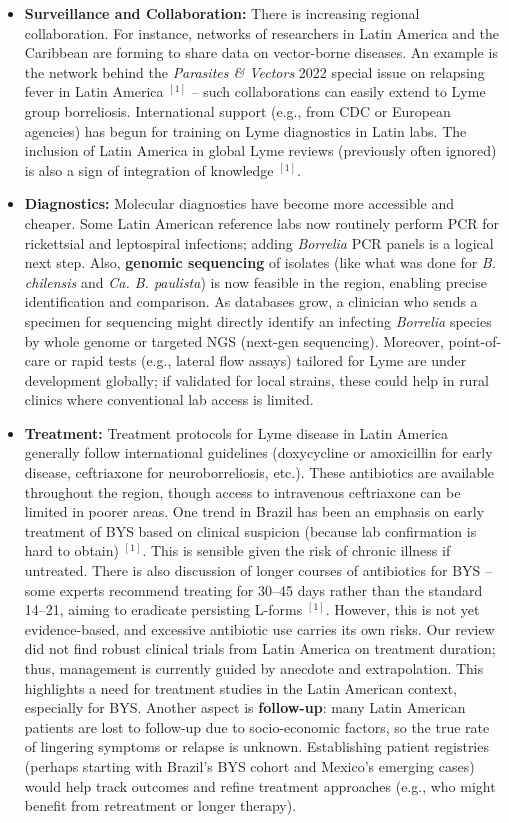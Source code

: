 \documentclass[11pt,letterpaper]{article}
\newcommand{\mycite}[1]{$^{[#1]}$}
\begin{document}
\begin{itemize}
    \item \textbf{Surveillance and Collaboration:} There is increasing regional collaboration. For instance, networks of researchers in Latin America and the Caribbean are forming to share data on vector-borne diseases. An example is the network behind the \textit{Parasites \& Vectors} 2022 special issue on relapsing fever in Latin America \mycite{1} – such collaborations can easily extend to Lyme group borreliosis. International support (e.g., from CDC or European agencies) has begun for training on Lyme diagnostics in Latin labs. The inclusion of Latin America in global Lyme reviews (previously often ignored) is also a sign of integration of knowledge \mycite{1}.

    \item \textbf{Diagnostics:} Molecular diagnostics have become more accessible and cheaper. Some Latin American reference labs now routinely perform PCR for rickettsial and leptospiral infections; adding \textit{Borrelia} PCR panels is a logical next step. Also, \textbf{genomic sequencing} of isolates (like what was done for \textit{B. chilensis} and \textit{Ca. B. paulista}) is now feasible in the region, enabling precise identification and comparison. As databases grow, a clinician who sends a specimen for sequencing might directly identify an infecting \textit{Borrelia} species by whole genome or targeted NGS (next-gen sequencing). Moreover, point-of-care or rapid tests (e.g., lateral flow assays) tailored for Lyme are under development globally; if validated for local strains, these could help in rural clinics where conventional lab access is limited.

    \item \textbf{Treatment:} Treatment protocols for Lyme disease in Latin America generally follow international guidelines (doxycycline or amoxicillin for early disease, ceftriaxone for neuroborreliosis, etc.). These antibiotics are available throughout the region, though access to intravenous ceftriaxone can be limited in poorer areas. One trend in Brazil has been an emphasis on early treatment of BYS based on clinical suspicion (because lab confirmation is hard to obtain) \mycite{1}. This is sensible given the risk of chronic illness if untreated. There is also discussion of longer courses of antibiotics for BYS – some experts recommend treating for 30–45 days rather than the standard 14–21, aiming to eradicate persisting L-forms \mycite{1}. However, this is not yet evidence-based, and excessive antibiotic use carries its own risks. Our review did not find robust clinical trials from Latin America on treatment duration; thus, management is currently guided by anecdote and extrapolation. This highlights a need for treatment studies in the Latin American context, especially for BYS. Another aspect is \textbf{follow-up}: many Latin American patients are lost to follow-up due to socio-economic factors, so the true rate of lingering symptoms or relapse is unknown. Establishing patient registries (perhaps starting with Brazil's BYS cohort and Mexico's emerging cases) would help track outcomes and refine treatment approaches (e.g., who might benefit from retreatment or longer therapy).


\end{itemize}
\end{document}
